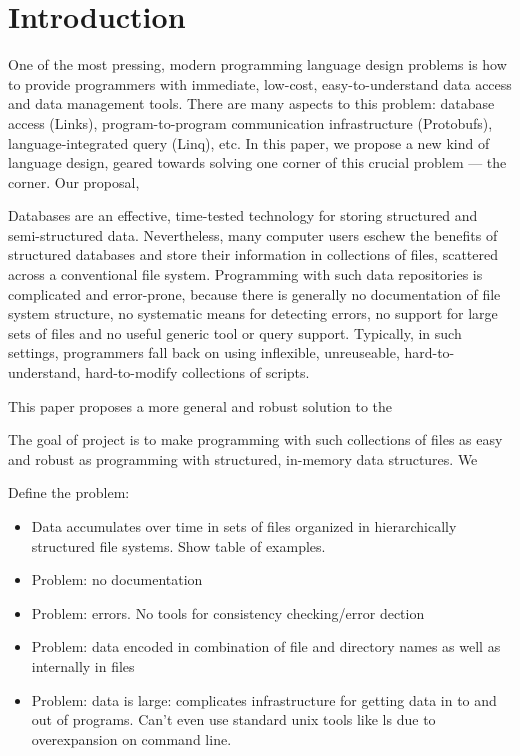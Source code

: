 \section {Introduction}
\label{sec:intro}


One of the most pressing, modern programming language design problems is how
to provide programmers with immediate, low-cost, easy-to-understand
data access and data management tools.  
There are many aspects to this problem: database access (Links), 
program-to-program
communication infrastructure (Protobufs), language-integrated query (Linq), etc.
In this paper, we propose a new
kind of language design, geared towards solving one corner of this
crucial problem --- the corner.  Our proposal, \forest{}

Databases are an effective, time-tested technology for storing structured
and semi-structured data.  Nevertheless, many
computer users eschew the benefits of structured databases
and store their information in collections of files, scattered across
a conventional file system.  Programming with such data repositories is
complicated and error-prone, because there is generally no documentation
of file system structure, no systematic means for detecting errors, no
support for large sets of files and no
useful generic tool or query support.  Typically, in such settings,
programmers fall back on using inflexible, unreuseable, hard-to-understand, 
hard-to-modify collections of scripts.

This paper proposes a more general and robust solution to the 
  
The goal of \forest{} project is to make programming with such collections
of files as easy and robust as programming with structured, in-memory data 
structures.  We



Define the problem:

\begin{itemize}
\item Data accumulates over time in sets of files organized in
hierarchically structured file systems.  Show table of examples.
\item Problem: no documentation
\item Problem: errors. No tools for consistency checking/error dection
\item Problem: data encoded in combination of file and directory names as
well as internally in files
\item Problem: data is large: complicates infrastructure for getting
  data in to and out of programs. Can't even use standard unix tools
  like ls due to overexpansion on command line.
\end{itemize}

